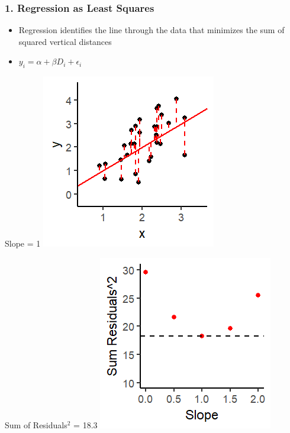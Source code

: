 \documentclass[xcolor=x11names,compress]{beamer}\usepackage[]{graphicx}\usepackage[]{color}
\makeatletter
\def\maxwidth{ %
  \ifdim\Gin@nat@width>\linewidth
    \linewidth
  \else
    \Gin@nat@width
  \fi
}
\newenvironment{knitrout}{}{} %
\renewcommand{\(}{\begin{columns}}
\renewcommand{\)}{\end{columns}}
\newcommand{\<}[1]{\begin{column}{#1}}
\renewcommand{\>}{\end{column}}
\makeatother
\begin{document}
\begin{frame}
\frametitle{1. Regression as Least Squares}
\begin{itemize}
\item Regression identifies the line through the data that minimizes the sum of squared vertical distances 
\item $y_i = \alpha + \beta D_i + \epsilon_i$
\end{itemize}
\begin{multicols}{2}
Slope = 1
\begin{knitrout}
\color{fgcolor}
\includegraphics[width=\maxwidth]{figure/graph_ols6-1} 

\end{knitrout}
\columnbreak
Sum of Residuals$^2$ = 18.3
\begin{knitrout}
\color{fgcolor}
\includegraphics[width=\maxwidth]{figure/graph_ssr6-1} 

\end{knitrout}
\end{multicols}
\end{frame}
\end{document}
